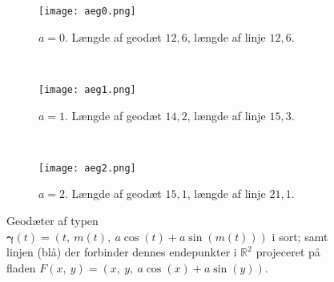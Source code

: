  \begin{figure}
        \centering
        \begin{subfigure}[b]{0.3\textwidth}
                \centering
                \texttt{[image: aeg0.png]}
                \caption{\(a=0\). Længde af geodæt \(12,6\), længde af linje \(12,6\).}
                \label{fig:aeg0}
        \end{subfigure}%
        ~ %
        \begin{subfigure}[b]{0.3\textwidth}
                \centering
                \texttt{[image: aeg1.png]}
                \caption{\(a=1\). Længde af geodæt \(14,2\), længde af linje \(15,3\).}
                \label{fig:aeg1}
        \end{subfigure}
        ~ %
        \begin{subfigure}[b]{0.3\textwidth}
                \centering
                \texttt{[image: aeg2.png]}
                \caption{\(a=2\). Længde af geodæt \(15,1\), længde af linje \(21,1\).}
                \label{fig:aeg2}
        \end{subfigure}
        \caption{
        Geodæter af typen \(\pmb{\gamma}(t) = (t,~m(t),~a\cos(t) + a\sin(m(t)))\) i sort;
        samt linjen (blå) der forbinder dennes endepunkter i \(\mathbb{R}^2\) projeceret på fladen \(F(x,~y)=(x,~y,~a\cos(x)+a\sin(y))\).}%
\end{figure}

